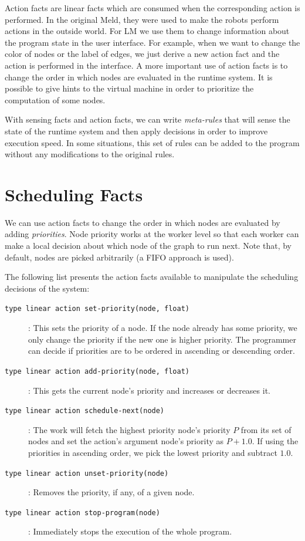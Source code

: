 Action facts are linear facts which are consumed when the corresponding action
is performed.  In the original Meld, they were used to make the robots perform
actions in the outside world.  For LM we use them to change information about
the program state in the user interface. For example, when we want to change the
color of nodes or the label of edges, we just derive a new action fact and the
action is performed in the interface.  A more important use of action facts is
to change the order in which nodes are evaluated in the runtime system. It is
possible to give hints to the virtual machine in order to prioritize the
computation of some nodes.

With sensing facts and action facts, we can write \emph{meta-rules} that will
sense the state of the runtime system and then apply decisions in order to
improve execution speed.  In some situations, this set of rules can be added to
the program without any modifications to the original rules.

\section{Scheduling Facts}

We can use action facts to change the order in which nodes are evaluated by
adding \emph{priorities}. Node priority works at the worker level so that each
worker can make a local decision about which node of the graph to run next.
Note that, by default, nodes are picked arbitrarily (a FIFO approach is used).

The following list presents the action facts available to manipulate the
scheduling decisions of the system:

\begin{description}

   \item[\texttt{type linear action set-priority(node, float)}]: This sets the
      priority of a node. If the node already has some priority, we only change
      the priority if the new one is higher priority. The programmer can decide
      if priorities are to be ordered in ascending or descending order.

   \item[\texttt{type linear action add-priority(node, float)}]: This gets the
      current node's priority and increases or decreases it.

   \item[\texttt{type linear action schedule-next(node)}]: The work will fetch
      the highest priority node's priority $P$ from its set of nodes and set the
      action's argument node's priority as $P + 1.0$. If using the priorities in
      ascending order, we pick the lowest priority and subtract $1.0$.

   \item[\texttt{type linear action unset-priority(node)}]: Removes the
      priority, if any, of a given node.

   \item[\texttt{type linear action stop-program(node)}]: Immediately stops the
      execution of the whole program.

\end{description}

